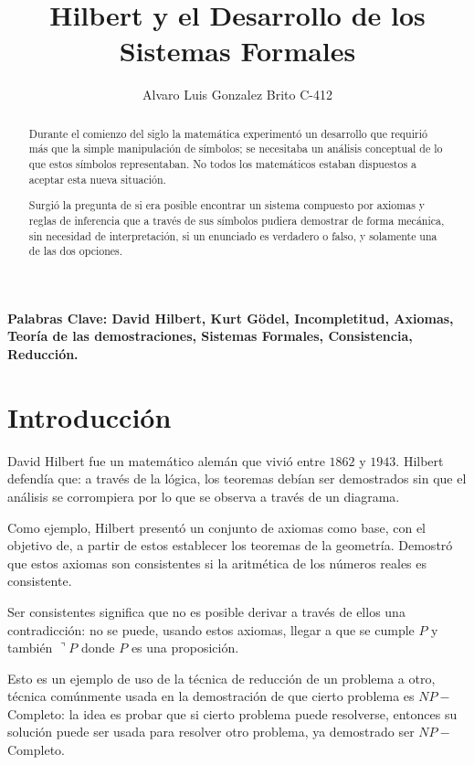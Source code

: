 \documentclass[14pt]{extarticle}
\newcommand{\RNum}[1]{\uppercase\expandafter{\romannumeral #1\relax}}
\begin{document}
\title{Hilbert y el Desarrollo de los Sistemas Formales}
\author{Alvaro Luis Gonzalez Brito C-412}

\maketitle


\begin{abstract}

Durante el comienzo del siglo \RNum{19} la matemática experimentó un desarrollo que requirió más que la simple manipulación de símbolos; se necesitaba un análisis conceptual de lo que estos símbolos representaban. No todos los matemáticos estaban dispuestos a aceptar esta nueva situación.

Surgió la pregunta de si era posible encontrar un sistema compuesto por axiomas y reglas de inferencia que a través de sus símbolos pudiera demostrar de forma mecánica, sin necesidad de interpretación, si un enunciado es verdadero o falso, y solamente una de las dos opciones.

\end{abstract} \hspace{10pt}

\textbf{Palabras Clave: David Hilbert, Kurt Gödel, Incompletitud, Axiomas, Teoría de las demostraciones, Sistemas Formales, Consistencia, Reducción.} 

\section{Introducción}

David Hilbert fue un matemático alemán que vivió entre $1862$ y $1943$. Hilbert defendía que: a través de la lógica, los teoremas debían ser demostrados sin que el análisis se corrompiera por lo que se observa a través de un diagrama.  \cite{hilbert-program}

Como ejemplo, Hilbert presentó un conjunto de axiomas como base, con el objetivo de, a partir de estos establecer los teoremas de la geometría. Demostró que estos axiomas son consistentes si la aritmética de los números reales es consistente. \cite{hilbert_g}

Ser consistentes significa que no es posible derivar a través de ellos una contradicción: no se puede, usando estos axiomas, llegar a que se cumple $P$ y también $\urcorner {P}$ donde $P$ es una proposición.

Esto es un ejemplo de uso de la técnica de reducción de un problema a otro, técnica comúnmente usada en la demostración de que cierto problema es $NP-$Completo: la idea es probar que si cierto problema puede resolverse, entonces su solución puede ser usada para resolver otro problema, ya demostrado ser $NP-$Completo. 
\end{document}
